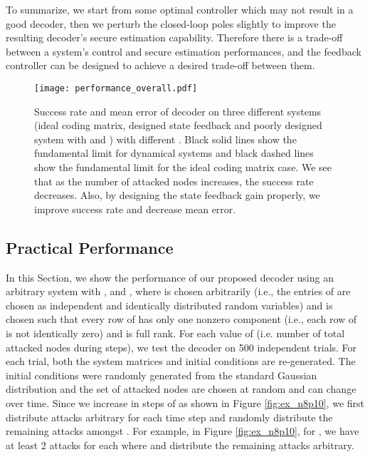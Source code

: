 \documentclass[journal]{IEEEtran}
\begin{document}
To summarize, we start from some optimal controller which may not result in a good decoder, then we perturb the closed-loop poles slightly to improve the resulting decoder's secure estimation capability. Therefore there is a trade-off between a system's control and secure estimation performances, and the feedback controller can be designed to achieve a desired trade-off between them.





\begin{figure}
\center
\texttt{[image: performance\_overall.pdf]}
\caption{Success rate and mean error of  decoder on three different systems (ideal coding matrix, designed state feedback and poorly designed system with  and ) with different . Black solid lines show the fundamental limit for dynamical systems and black dashed lines show the fundamental limit for the ideal coding matrix case. We see that as the number of attacked nodes increases, the success rate decreases. Also, by designing the state feedback gain properly, we improve success rate and decrease mean error. }
\label{fig:ex_n8_overall}
\end{figure}





\subsection{Practical Performance}\label{sec:prac_perf}
In this Section, we show the performance of our proposed decoder using an arbitrary system with ,  and , where  is chosen arbitrarily (i.e., the entries of  are chosen as independent and identically distributed random variables) and  is chosen such that every row of  has only one nonzero component (i.e., each row of  is not identically zero) and is full rank. 
For each value of  (i.e. number of total attacked nodes during  steps), we test the decoder on 500 independent trials. For each trial, both the system matrices and initial conditions are re-generated. The initial conditions  were randomly generated from the standard Gaussian distribution and the set of attacked nodes are chosen at random and can change over time. Since we increase  in steps of  as shown in Figure \ref{fig:ex_n8p10}, we first distribute  attacks arbitrary for each time step  and randomly distribute the remaining  attacks amongst . For example, in Figure \ref{fig:ex_n8p10}, for , we have at least 2 attacks for each  where  and 
distribute the remaining  attacks arbitrary. 
\end{document}
